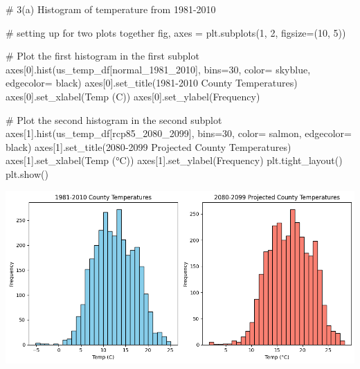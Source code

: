 \documentclass[
  letterpaper,
  DIV=11,
  numbers=noendperiod]{scrartcl}
\newenvironment{Shaded}{\begin{snugshade}}{\end{snugshade}}
\newcommand{\CommentTok}[1]{\textcolor[rgb]{0.37,0.37,0.37}{#1}}
\newcommand{\DecValTok}[1]{\textcolor[rgb]{0.68,0.00,0.00}{#1}}
\newcommand{\NormalTok}[1]{\textcolor[rgb]{0.00,0.23,0.31}{#1}}
\newcommand{\OperatorTok}[1]{\textcolor[rgb]{0.37,0.37,0.37}{#1}}
\newcommand{\StringTok}[1]{\textcolor[rgb]{0.13,0.47,0.30}{#1}}
\begin{document}
\begin{Shaded}
\begin{Highlighting}[]
\CommentTok{\# 3(a) Histogram of temperature from 1981{-}2010}

\CommentTok{\# setting up for two plots together}
\NormalTok{fig, axes }\OperatorTok{=}\NormalTok{ plt.subplots(}\DecValTok{1}\NormalTok{, }\DecValTok{2}\NormalTok{, figsize}\OperatorTok{=}\NormalTok{(}\DecValTok{10}\NormalTok{, }\DecValTok{5}\NormalTok{))}

\CommentTok{\# Plot the first histogram in the first subplot}
\NormalTok{axes[}\DecValTok{0}\NormalTok{].hist(us\_temp\_df[}\StringTok{\textquotesingle{}normal\_1981\_2010\textquotesingle{}}\NormalTok{], bins}\OperatorTok{=}\DecValTok{30}\NormalTok{, color}\OperatorTok{=} \StringTok{\textquotesingle{}skyblue\textquotesingle{}}\NormalTok{, edgecolor}\OperatorTok{=} \StringTok{\textquotesingle{}black\textquotesingle{}}\NormalTok{)}
\NormalTok{axes[}\DecValTok{0}\NormalTok{].set\_title(}\StringTok{\textquotesingle{}1981{-}2010 County Temperatures\textquotesingle{}}\NormalTok{)}
\NormalTok{axes[}\DecValTok{0}\NormalTok{].set\_xlabel(}\StringTok{\textquotesingle{}Temp (C)\textquotesingle{}}\NormalTok{)}
\NormalTok{axes[}\DecValTok{0}\NormalTok{].set\_ylabel(}\StringTok{\textquotesingle{}Frequency\textquotesingle{}}\NormalTok{)}

\CommentTok{\# Plot the second histogram in the second subplot}
\NormalTok{axes[}\DecValTok{1}\NormalTok{].hist(us\_temp\_df[}\StringTok{\textquotesingle{}rcp85\_2080\_2099\textquotesingle{}}\NormalTok{], bins}\OperatorTok{=}\DecValTok{30}\NormalTok{, color}\OperatorTok{=} \StringTok{\textquotesingle{}salmon\textquotesingle{}}\NormalTok{, edgecolor}\OperatorTok{=} \StringTok{\textquotesingle{}black\textquotesingle{}}\NormalTok{)}
\NormalTok{axes[}\DecValTok{1}\NormalTok{].set\_title(}\StringTok{\textquotesingle{}2080{-}2099 Projected County Temperatures\textquotesingle{}}\NormalTok{)}
\NormalTok{axes[}\DecValTok{1}\NormalTok{].set\_xlabel(}\StringTok{\textquotesingle{}Temp (°C)\textquotesingle{}}\NormalTok{)}
\NormalTok{axes[}\DecValTok{1}\NormalTok{].set\_ylabel(}\StringTok{\textquotesingle{}Frequency\textquotesingle{}}\NormalTok{)}
\NormalTok{plt.tight\_layout()}
\NormalTok{plt.show()}
\end{Highlighting}
\end{Shaded}

\includegraphics{Assignment-1_ICP_files/figure-pdf/cell-7-output-1.png}
\end{document}
